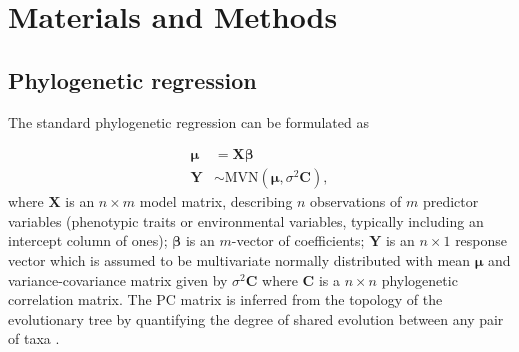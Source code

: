 \documentclass[12pt]{article}
\begin{document}
\section{Materials and Methods}

\newcommand{\bX}{{\mathbf X}}
\newcommand{\bbeta}{{\boldsymbol \beta}}
\newcommand{\bmu}{{\boldsymbol \mu}}
\newcommand{\bY}{{\mathbf Y}}
\newcommand{\bC}{{\mathbf C}}
\newcommand{\bZ}{{\mathbf Z}}
\newcommand{\bb}{{\mathbf b}}
\newcommand{\be}{{\mathbf e}}
\newcommand{\bSigma}{{\boldsymbol \Sigma}}

\subsection{Phylogenetic regression}

The standard phylogenetic regression can be formulated as


\begin{align}
\bmu & = \bX \bbeta  \label{eq:gls1} \\ 
\bY & \sim \textrm{MVN}(\bmu,\sigma^{2} \bC), \label{eq:gls2}
\end{align}
where $\bX$ is an $n \times m$ model matrix, describing $n$ observations of $m$ predictor variables (phenotypic traits or environmental variables, typically including an intercept column of ones); $\bbeta$ is an $m$-vector of coefficients; $\bY$ is an $n \times 1$ response vector which is assumed to be multivariate normally distributed with mean $\bmu$ and variance-covariance matrix given by $\sigma^{2} \bC$ where $\bC$ is a $n \times n$ phylogenetic correlation matrix.
The PC matrix is inferred from the topology of the evolutionary tree by quantifying the degree of shared evolution between any pair of taxa \citep{garamszegi2014modern}.


\end{document}
